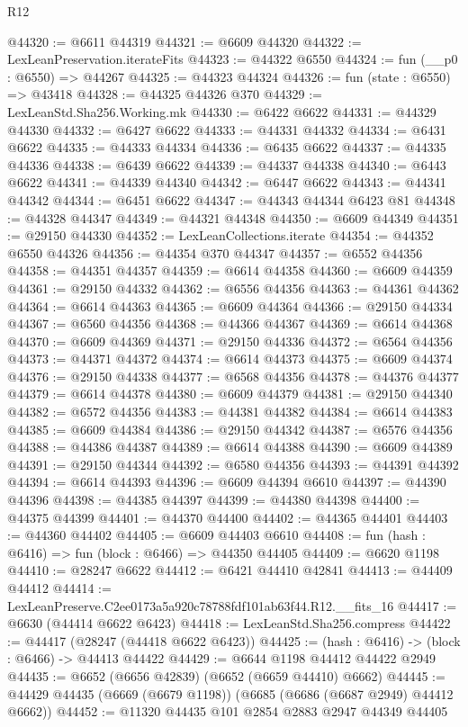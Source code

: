 \begin{lexlean}{R12}
\begin{coremodule}
@44320 := @6611 @44319
@44321 := @6609 @44320
@44322 := LexLeanPreservation.iterateFits
@44323 := @44322 @6550
@44324 := fun (__p0 : @6550) => @44267
@44325 := @44323 @44324
@44326 := fun (state : @6550) => @43418
@44328 := @44325 @44326 @370
@44329 := LexLeanStd.Sha256.Working.mk
@44330 := @6422 @6622
@44331 := @44329 @44330
@44332 := @6427 @6622
@44333 := @44331 @44332
@44334 := @6431 @6622
@44335 := @44333 @44334
@44336 := @6435 @6622
@44337 := @44335 @44336
@44338 := @6439 @6622
@44339 := @44337 @44338
@44340 := @6443 @6622
@44341 := @44339 @44340
@44342 := @6447 @6622
@44343 := @44341 @44342
@44344 := @6451 @6622
@44347 := @44343 @44344 @6423 @81
@44348 := @44328 @44347
@44349 := @44321 @44348
@44350 := @6609 @44349
@44351 := @29150 @44330
@44352 := LexLeanCollections.iterate
@44354 := @44352 @6550 @44326
@44356 := @44354 @370 @44347
@44357 := @6552 @44356
@44358 := @44351 @44357
@44359 := @6614 @44358
@44360 := @6609 @44359
@44361 := @29150 @44332
@44362 := @6556 @44356
@44363 := @44361 @44362
@44364 := @6614 @44363
@44365 := @6609 @44364
@44366 := @29150 @44334
@44367 := @6560 @44356
@44368 := @44366 @44367
@44369 := @6614 @44368
@44370 := @6609 @44369
@44371 := @29150 @44336
@44372 := @6564 @44356
@44373 := @44371 @44372
@44374 := @6614 @44373
@44375 := @6609 @44374
@44376 := @29150 @44338
@44377 := @6568 @44356
@44378 := @44376 @44377
@44379 := @6614 @44378
@44380 := @6609 @44379
@44381 := @29150 @44340
@44382 := @6572 @44356
@44383 := @44381 @44382
@44384 := @6614 @44383
@44385 := @6609 @44384
@44386 := @29150 @44342
@44387 := @6576 @44356
@44388 := @44386 @44387
@44389 := @6614 @44388
@44390 := @6609 @44389
@44391 := @29150 @44344
@44392 := @6580 @44356
@44393 := @44391 @44392
@44394 := @6614 @44393
@44396 := @6609 @44394 @6610
@44397 := @44390 @44396
@44398 := @44385 @44397
@44399 := @44380 @44398
@44400 := @44375 @44399
@44401 := @44370 @44400
@44402 := @44365 @44401
@44403 := @44360 @44402
@44405 := @6609 @44403 @6610
@44408 := fun (hash : @6416) => fun (block : @6466) => @44350 @44405
@44409 := @6620 @1198
@44410 := @28247 @6622
@44412 := @6421 @44410 @42841
@44413 := @44409 @44412
@44414 := LexLeanPreserve.C2ee0173a5a920c78788fdf101ab63f44.R12.__fits_16
@44417 := @6630 (@44414 @6622 @6423)
@44418 := LexLeanStd.Sha256.compress
@44422 := @44417 (@28247 (@44418 @6622 @6423))
@44425 := (hash : @6416) -> (block : @6466) -> @44413 @44422
@44429 := @6644 @1198 @44412 @44422 @2949
@44435 := @6652 (@6656 @42839) (@6652 (@6659 @44410) @6662)
@44445 := @44429 @44435 (@6669 (@6679 @1198)) (@6685 (@6686 (@6687 @2949) @44412 @6662))
@44452 := @11320 @44435 @101 @2854 @2883 @2947 @44349 @44405

\end{coremodule}
\end{lexlean}
